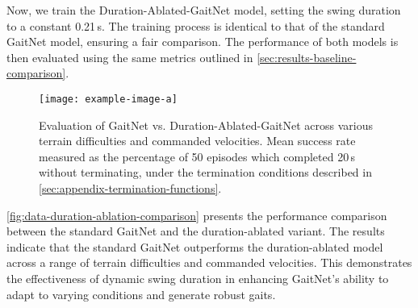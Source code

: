 Now, we train the Duration-Ablated-GaitNet model, setting the swing
duration to a constant 0.21\,s. The training process is identical to
that of the standard GaitNet model, ensuring a fair comparison. The
performance of both models is then evaluated using the same metrics outlined in
\autoref{sec:results-baseline-comparison}.

\begin{figure}[H]
  \centering
  \texttt{[image: example-image-a]}
  \caption{Evaluation of GaitNet vs. Duration-Ablated-GaitNet
    across various terrain difficulties and commanded velocities.
    Mean success rate measured as the percentage of 50 episodes
    which completed 20\,s without terminating, under the termination
  conditions described in \autoref{sec:appendix-termination-functions}.}
  \label{fig:data-duration-ablation-comparison}
\end{figure}

\autoref{fig:data-duration-ablation-comparison} presents the
performance comparison between the standard GaitNet and the
duration-ablated variant. The results indicate that the standard
GaitNet outperforms the duration-ablated model across a range of
terrain difficulties and commanded velocities. This demonstrates the
effectiveness of dynamic swing duration in enhancing GaitNet's
ability to adapt to varying conditions and generate robust gaits.
